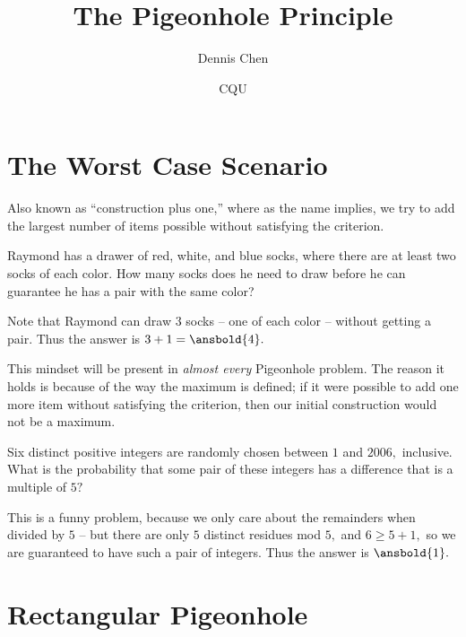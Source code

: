 \documentclass[mast]{lucky}
\title{The Pigeonhole Principle}
\author{Dennis Chen}
\date{CQU}
\begin{document}
\maketitle


\section{The Worst Case Scenario}

Also known as ``construction plus one,'' where as the name implies, we try to add the largest number of items possible without satisfying the criterion. 

\begin{exam}
Raymond has a drawer of red, white, and blue socks, where there are at least two socks of each color. How many socks does he need to draw before he can guarantee he has a pair with the same color?
\end{exam}

\begin{sol}
Note that Raymond can draw $3$ socks -- one of each color -- without getting a pair. Thus the answer is $3+1=\ansbold{4}.$
\end{sol}

This mindset will be present in \emph{almost every} Pigeonhole problem. The reason it holds is because of the way the maximum is defined; if it were possible to add one more item without satisfying the criterion, then our initial construction would not be a maximum.

\begin{exam}[AMC 10A 2006/20]
Six distinct positive integers are randomly chosen between $1$ and $2006,$ inclusive. What is the probability that some pair of these integers has a difference that is a multiple of $5?$ 
\end{exam}

\begin{sol}
This is a funny problem, because we only care about the remainders when divided by $5$ -- but there are only $5$ distinct residues mod $5,$ and $6\geq 5+1,$ so we are guaranteed to have such a pair of integers. Thus the answer is $\ansbold{1}.$
\end{sol}

\section{Rectangular Pigeonhole}
\end{document}
